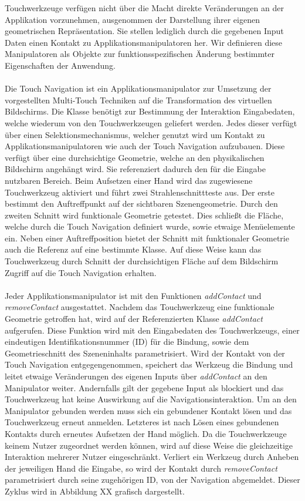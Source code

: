 Touchwerkzeuge verfügen nicht über die Macht direkte Veränderungen an der Applikation vorzunehmen, ausgenommen der Darstellung ihrer eigenen geometrischen Repräsentation. Sie stellen lediglich durch die gegebenen Input Daten einen Kontakt zu Applikationsmanipulatoren her. Wir definieren diese Manipulatoren als Objekte zur funktionsspezifischen Änderung bestimmter Eigenschaften der Anwendung.
\\\\
Die Touch Navigation ist ein Applikationsmanipulator zur Umsetzung der vorgestellten Multi-Touch Techniken auf die Transformation des virtuellen Bildschirms. Die Klasse benötigt zur Bestimmung der Interaktion Eingabedaten, welche wiederum von den Touchwerkzeugen geliefert werden. Jedes dieser verfügt über einen Selektionsmechanismus, welcher genutzt wird um Kontakt zu Applikationsmanipulatoren wie auch der Touch Navigation aufzubauen. Diese verfügt über eine durchsichtige Geometrie, welche an den physikalischen Bildschirm angehängt wird. Sie referenziert dadurch den für die Eingabe nutzbaren Bereich. Beim Aufsetzen einer Hand wird das zugewiesene Touchwerkzeug aktiviert und führt zwei Strahlenschnittteste aus. Der erste bestimmt den Auftreffpunkt auf der sichtbaren Szenengeometrie. Durch den zweiten Schnitt wird funktionale Geometrie getestet. Dies schließt die Fläche, welche durch die Touch Navigation definiert wurde, sowie etwaige Menüelemente ein. Neben einer Auftreffposition bietet der Schnitt mit funktionaler Geometrie auch die Referenz auf eine bestimmte Klasse. Auf diese Weise kann das Touchwerkzeug durch Schnitt der durchsichtigen Fläche auf dem Bildschirm Zugriff auf die Touch Navigation erhalten.
\\\\
Jeder Applikationsmanipulator ist mit den Funktionen \emph{addContact} und \emph{removeContact} ausgestattet. Nachdem das Touchwerkzeug eine funktionale Geometrie getroffen hat, wird auf der Referenzierten Klasse \emph{addContact} aufgerufen. Diese Funktion wird mit den Eingabedaten des Touchwerkzeugs, einer eindeutigen Identifikationsnummer (ID) für die Bindung, sowie dem Geometrieschnitt des Szeneninhalts parametrisiert. Wird der Kontakt von der Touch Navigation entgegengenommen, speichert das Werkzeug die Bindung und leitet etwaige Veränderungen des eigenen Inputs über \emph{addContact} an den Manipulator weiter. Andernfalls gilt der gegebene Input als blockiert und das Touchwerkzeug hat keine Auswirkung auf die Navigationsinteraktion. Um an den Manipulator gebunden werden muss sich ein gebundener Kontakt lösen und das Touchwerkzeug erneut anmelden. Letzteres ist nach Lösen eines gebundenen Kontakts durch erneutes Aufsetzen der Hand möglich. Da die Touchwerkzeuge keinem Nutzer zugeordnet werden können, wird auf diese Weise die gleichzeitige Interaktion mehrerer Nutzer eingeschränkt. Verliert ein Werkzeug durch Anheben der jeweiligen Hand die Eingabe, so wird der Kontakt durch \emph{removeContact} parametrisiert durch seine zugehörigen ID, von der Navigation abgemeldet. Dieser Zyklus wird in Abbildung XX grafisch dargestellt.
